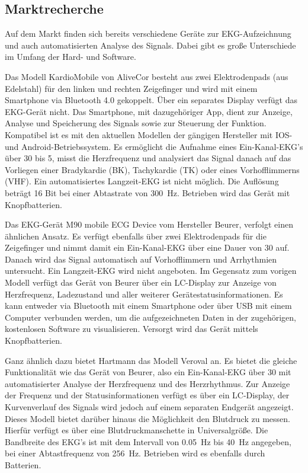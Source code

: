 \subsection{Marktrecherche}

Auf dem Markt finden sich bereits verschiedene Geräte zur EKG-Aufzeichnung und auch automatisierten Analyse des Signals. Dabei gibt es große Unterschiede im Umfang der Hard- und Software.

Das Modell KardioMobile von AliveCor besteht aus zwei Elektrodenpads (aus Edelstahl) für den linken und rechten Zeigefinger und wird mit einem Smartphone via Bluetooth 4.0 gekoppelt. Über ein separates Display verfügt das EKG-Gerät nicht. Das Smartphone, mit dazugehöriger App, dient zur Anzeige, Analyse und Speicherung des Signals sowie zur Steuerung der Funktion. Kompatibel ist es mit den aktuellen Modellen der gängigen Hersteller mit IOS- und Android-Betriebssystem. Es ermöglicht die Aufnahme eines Ein-Kanal-EKG's über \SI{30}{\sec} bis \SI{5}{\min}, misst die Herzfrequenz und analysiert das Signal danach auf das Vorliegen einer Bradykardie (BK), Tachykardie (TK) oder eines Vorhofflimmerns (VHF). Ein automatisiertes Langzeit-EKG ist nicht möglich. Die Auflösung beträgt 16 Bit bei einer Abtastrate von \SI{300}{\hertz}. Betrieben wird das Gerät mit Knopfbatterien.

Das EKG-Gerät M90 mobile ECG Device vom Hersteller Beurer, verfolgt einen ähnlichen Ansatz. Es verfügt ebenfalls über zwei Elektrodenpads für die Zeigefinger und nimmt damit ein Ein-Kanal-EKG über eine Dauer von \SI{30}{\sec} auf. Danach wird das Signal automatisch auf Vorhofflimmern und Arrhythmien untersucht. Ein Langzeit-EKG wird nicht angeboten. Im Gegensatz zum vorigen Modell verfügt das Gerät von Beurer über ein LC-Display zur Anzeige von Herzfrequenz, Ladezustand und aller weiterer Gerätestatusinformationen. Es kann entweder via Bluetooth mit einem Smartphone oder über USB mit einem Computer verbunden werden, um die aufgezeichneten Daten in der zugehörigen, kostenlosen Software zu visualisieren. Versorgt wird das Gerät mittels Knopfbatterien.

Ganz ähnlich dazu bietet Hartmann das Modell Veroval an. Es bietet die gleiche Funktionalität wie das Gerät von Beurer, also ein Ein-Kanal-EKG über \SI{30}{\sec} mit automatisierter Analyse der Herzfrequenz und des Herzrhythmus. Zur Anzeige der Frequenz und der Statusinformationen verfügt es über ein LC-Display, der Kurvenverlauf des Signals wird jedoch auf einem separaten Endgerät angezeigt. Dieses Modell bietet darüber hinaus die Möglichkeit den Blutdruck zu messen. Hierfür verfügt es über eine Blutdruckmanschette in Universalgröße. Die Bandbreite des EKG's ist mit dem Intervall von \SI{0.05} {\hertz} bis \SI{40} {\hertz} angegeben, bei einer Abtastfrequenz von \SI{256} {\hertz}. Betrieben wird es ebenfalls durch Batterien. 

